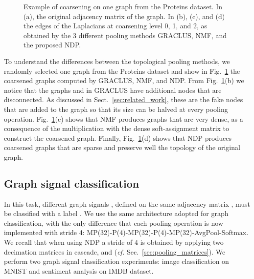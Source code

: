 \documentclass[journal]{IEEEtran}
\begin{document}
\begin{figure}[!ht]
    \centering
    \vspace{-.3cm}
    
    \vspace{-.3cm}
    
    \vspace{-.3cm}
    
    \caption{\footnotesize Example of coarsening on one graph from the Proteins dataset. In (a), the original adjacency matrix of the graph. In (b), (c), and (d) the edges of the Laplacians at coarsening level 0, 1, and 2, as obtained by the 3 different pooling methods GRACLUS, NMF, and the proposed NDP.}
    \label{fig:coarsening_enzymes}
\end{figure}

To understand the differences between the topological pooling methods, we randomly selected one graph from the Proteins dataset and show in Fig.~\ref{fig:coarsening_enzymes} the coarsened graphs computed by GRACLUS, NMF, and NDP.
From Fig.~\ref{fig:coarsening_enzymes}(b) we notice that the graphs  and  in GRACLUS have additional nodes that are disconnected.
As discussed in Sect.~\ref{sec:related_work}, these are the fake nodes that are added to the graph so that its size can be halved at every pooling operation.
Fig.~\ref{fig:coarsening_enzymes}(c) shows that NMF produces graphs that are very dense, as a consequence of the multiplication with the dense soft-assignment matrix to construct the coarsened graph.
Finally, Fig.~\ref{fig:coarsening_enzymes}(d) shows that NDP produces coarsened graphs that are sparse and preserve well the topology of the original graph.


\subsection{Graph signal classification}
In this task, different graph signals , defined on the same adjacency matrix , must be classified with a label .
We use the same architecture adopted for graph classification, with the only difference that each pooling operation is now implemented with stride 4: MP(32)-P(4)-MP(32)-P(4)-MP(32)-AvgPool-Softmax.
We recall that when using NDP a stride of 4 is obtained by applying two decimation matrices in cascade,  and  (\textit{cf.} Sec.~\ref{sec:pooling_matrices}).
We perform two graph signal classification experiments: image classification on MNIST and sentiment analysis on IMDB dataset.
\newline
\end{document}
